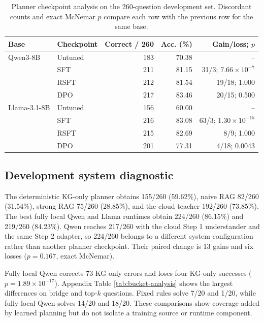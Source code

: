 \begin{table}[t]
  \centering
  \caption{Planner checkpoint analysis on the 260-question development set.  Discordant counts and
  exact McNemar $p$ compare each row with the previous row for the same base.}
  \label{tab:ladder}
  \small
  \begin{tabular}{llrrr}
    \toprule
    Base & Checkpoint & Correct / 260 & Acc. (\%) & Gain/loss; $p$ \\
    \midrule
    Qwen3-8B & Untuned & 183 & 70.38 & -- \\
              & SFT & 211 & 81.15 & 31/3; $7.66\times10^{-7}$ \\
              & RSFT & 212 & 81.54 & 19/18; 1.000 \\
              & DPO & 217 & 83.46 & 20/15; 0.500 \\
    \midrule
    Llama-3.1-8B & Untuned & 156 & 60.00 & -- \\
              & SFT & 216 & 83.08 & 63/3; $1.30\times10^{-15}$ \\
              & RSFT & 215 & 82.69 & 8/9; 1.000 \\
              & DPO & 201 & 77.31 & 4/18; 0.0043 \\
    \bottomrule
  \end{tabular}
\end{table}

\subsection{Development system diagnostic}

The deterministic KG-only planner obtains 155/260 (59.62\%), naive RAG 82/260 (31.54\%), strong
RAG 75/260 (28.85\%), and the cloud teacher 192/260 (73.85\%).  The best fully local Qwen and Llama
runtimes obtain 224/260 (86.15\%) and 219/260 (84.23\%).  Qwen reaches 217/260 with the cloud Step
1 understander and the same Step 2 adapter, so 224/260 belongs to a different system configuration
rather than another planner checkpoint.  Their paired change is 13 gains and six losses
($p=0.167$, exact McNemar).

Fully local Qwen corrects 73 KG-only errors and loses four KG-only successes
($p=1.89\times10^{-17}$).  Appendix Table \ref{tab:bucket-analysis} shows the largest differences
on bridge and top-$k$ questions.  Fixed rules solve 7/20 and 1/20, while fully local Qwen solves
14/20 and 18/20.  These comparisons show coverage added by learned planning but do not isolate a
training source or runtime component.

